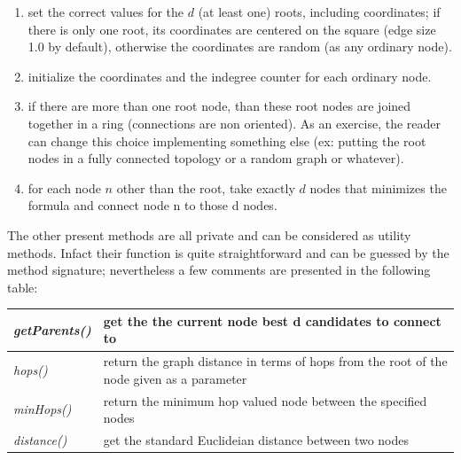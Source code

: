 \documentclass[a4paper,12pt]{article}
\begin{document}
\begin{enumerate} 

\item set the correct values for the $d$ (at least one) roots, including 
coordinates; if there is only one root, its coordinates are centered on 
the square (edge size 1.0 by default), otherwise the coordinates are 
random (as any ordinary node).
 
\item initialize the coordinates and the indegree counter for each 
ordinary node.
 
\item if there are more than one root node, than these root nodes are 
joined together in a ring (connections are non oriented). As an exercise, 
the reader can change this choice implementing something else (ex: putting 
the root nodes in a fully connected topology or a random graph or whatever).
 
\item for each node $n$ other than the root, take exactly $d$ nodes that 
minimizes the formula and connect node n to those d nodes.

\end{enumerate}

The other present methods are all private and can be considered as 
utility methods. Infact their function is quite straightforward and can 
be guessed by the method signature; nevertheless a few comments are 
presented in the following table:

\begin{center}
\begin{tabular}{|l|p{4in}|}
\hline
\emph{getParents()} & get the the current node best d candidates to 
connect to\\
\hline
\emph{hops()} & return the graph distance in terms of hops from the 
root of the node given as a parameter\\
\hline
\emph{minHops()} & return the minimum hop valued node between the 
specified nodes\\
\hline
\emph{distance()} & get the standard Euclideian distance between two nodes\\
\hline
\end{tabular}
\end{center}
\end{document}

